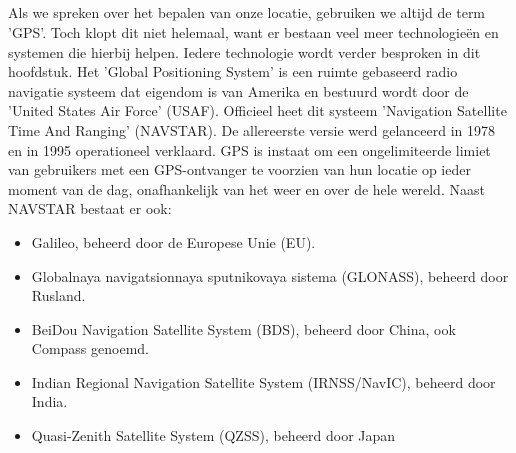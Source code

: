 \subsection{}
Als we spreken over het bepalen van onze locatie, gebruiken we altijd de term 'GPS'. Toch klopt dit niet helemaal, want er bestaan veel meer technologieën en systemen die hierbij helpen. Iedere technologie wordt verder besproken in dit hoofdstuk.
\newline
Het 'Global Positioning System' is een ruimte gebaseerd radio navigatie systeem dat eigendom is van Amerika en bestuurd wordt door de 'United States Air Force' (USAF). Officieel heet dit systeem 'Navigation Satellite Time And Ranging' (NAVSTAR). De allereerste versie werd gelanceerd in 1978 en in 1995 operationeel verklaard. GPS is instaat om een ongelimiteerde limiet van gebruikers met een GPS-ontvanger te voorzien van hun locatie op ieder moment van de dag, onafhankelijk van het weer en over de hele wereld. \autocite{gps}
\newline
Naast NAVSTAR bestaat er ook:
\begin{itemize}
	\item Galileo, beheerd door de Europese Unie (EU).
	\item Globalnaya navigatsionnaya sputnikovaya sistema (GLONASS), beheerd door Rusland.
	\item BeiDou Navigation Satellite System (BDS), beheerd door China, ook Compass genoemd.
	\item Indian Regional Navigation Satellite System (IRNSS/NavIC), beheerd door India.
	\item Quasi-Zenith Satellite System (QZSS), beheerd door Japan
\end{itemize}

